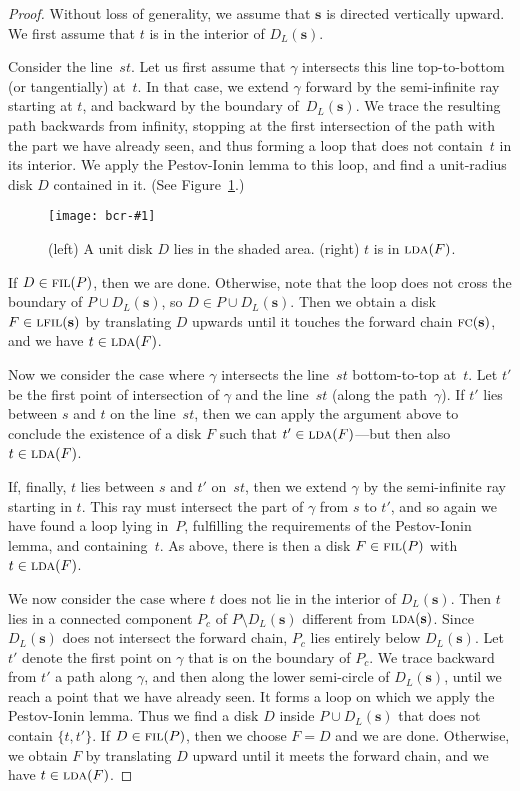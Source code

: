 \documentclass[a4paper]{article}
\newcommand{\vecs}{{\mathbf{s}}}
\newcommand{\ldisk}{{D_L}}
\DeclareMathOperator{\FIL}{\textsc{fil}}
\DeclareMathOperator{\LFIL}{\textsc{lfil}}
\DeclareMathOperator{\LDA}{\textsc{lda}}
\DeclareMathOperator{\FC}{\textsc{fc}}
\newcommand{\epsfigure}[2]{
  \begin{figure}[htb]
    \centerline{\texttt{[image: bcr-\#1]}}
    \caption{#2}
    \label{f:#1}
  \end{figure}}
\begin{document}
\begin{proof}
  Without loss of generality, we assume that $\vecs$ is directed
  vertically upward. We first assume that $t$ is in the
  interior of $\ldisk(\vecs)$.
 
  Consider the line~$st$. Let us first assume that $\gamma$ intersects
  this line top-to-bottom (or tangentially) at~$t$. In that case, we
  extend $\gamma$ forward by the semi-infinite ray starting at $t$,
  and backward by the boundary of~$\ldisk(\vecs)$.  We trace the
  resulting path backwards 
  from infinity, stopping at the first intersection of the path with
  the part we have already seen, and thus forming a loop that does not
  contain~$t$ in its interior.  We apply the Pestov-Ionin lemma to
  this loop, and find a unit-radius disk $D$ contained in it. (See
  Figure~\ref{f:proof1}.)
\epsfigure{proof1}{(left) A unit disk $D$ lies in the shaded area.
  (right) $t$ is in $\LDA(F)$.}
If $D \in \FIL(P)$, then we are done. Otherwise, note that the loop
  does not cross the boundary of $P \cup \ldisk(\vecs)$, so
  $D \in P \cup \ldisk(\vecs)$. Then we obtain a disk $F \in
  \LFIL(\vecs)$ by translating $D$ upwards until it touches the
  forward chain $\FC(\vecs)$,  and we have $t \in \LDA(F)$.

  Now we consider the case where $\gamma$ intersects the line~$st$
  bottom-to-top at~$t$. Let $t'$ be the first point of intersection of
  $\gamma$ and the line~$st$ (along the path~$\gamma$).  If $t'$ lies
  between $s$ and $t$ on the line~$st$, then we can apply the argument
  above to conclude the existence of a disk $F$ such that $t' \in
  \LDA(F)$---but then also $t \in \LDA(F)$.

  If, finally, $t$ lies between $s$ and $t'$ on~$st$, then we extend
  $\gamma$ by the semi-infinite ray starting in $t$.  This ray must
  intersect the part of $\gamma$ from $s$ to $t'$, and so again we
  have found a loop lying in~$P$, fulfilling the requirements of the
  Pestov-Ionin lemma, and containing~$t$.  As above, there is then a
  disk $F\in \FIL(P)$ with $t\in \LDA(F)$.

  We now consider the case where $t$ does not lie in the interior of 
  $\ldisk(\vecs)$.  Then $t$ lies in a connected component $P_c$ of 
  $P \setminus \ldisk(\vecs)$ 
  different from $\LDA(\vecs)$. Since $\ldisk(\vecs)$ does not intersect the
  forward chain, $P_c$ lies entirely below $\ldisk(\vecs)$. Let $t'$ denote the
  first point on $\gamma$ that is on the boundary of $P_c$. We trace
  backward from $t'$ a path along $\gamma$, and then along the lower semi-circle
  of $\ldisk(\vecs)$, until we reach a point that we have already seen. It forms
  a loop on which we apply the Pestov-Ionin lemma. Thus we find a
  disk $D$ inside $P \cup \ldisk(\vecs)$ that does not contain $\{t,t'\}$. 
  If  $D \in \FIL(P)$, then we choose $F=D$ and we are done. 
  Otherwise, we obtain $F$ by translating $D$ upward until it
  meets the forward chain, and we have $t \in \LDA(F)$.
\end{proof}
\end{document}
